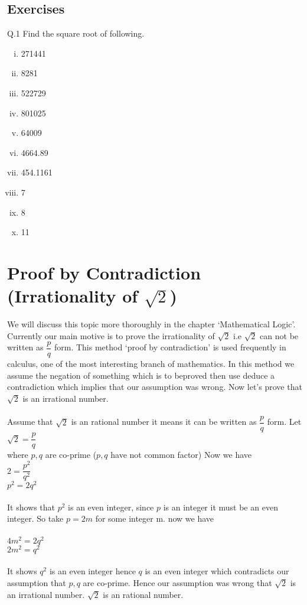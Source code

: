 \subsection{Exercises}
Q.1 Find the square root of following.
\begin{multicols}{5}
\begin{enumerate}[(i)]
\item 271441
\item 8281
\item 522729
\item 801025
\item 64009
\item 4664.89
\item 454.1161
\item 7
\item 8
\item 11
\end{enumerate}
\end{multicols}
\section{Proof by Contradiction (Irrationality of $\sqrt{2}$)}
We will discuss this topic more thoroughly in the chapter ‘Mathematical
Logic’. Currently
our main motive is to prove the irrationality of $\sqrt{2} \text{ i.e } \sqrt{2}$
can not be written as $\dfrac{p}{q}$ form. This
method ‘proof by contradiction’ is used frequently in calculus, one of
the most interesting
branch of mathematics. In this method we assume the negation of
something which is to beproved then use deduce a contradiction which
implies that our assumption was wrong. Now let’s prove that $\sqrt{2}$ is an
irrational number.\\\\
Assume that $\sqrt{2}$ is an rational number it means it can be written
as $\dfrac{p}{q}$
form. Let\\
$\sqrt{2} = \dfrac{p}{q}$\\
where $p, q$ are co-prime ($p, q$ have not common factor) Now we have\\
$2 = \dfrac{p^2}{q^2}$\\
$p^2 = 2 q^2$\\\\
It shows that $p^2$ is an even integer, since $p$ is an integer it must be
an even integer. So take $p = 2m$ for some integer m. now we
have\\\\
$4 m^2 = 2q^2$\\
$2 m^2 = q^2$\\\\
It shows $q^2$ is an even integer hence $q$ is an even integer which
contradicts our assumption
that $p, q$ are co-prime. Hence our assumption was wrong that
$\sqrt{2}$ is an irrational number.
$\sqrt{2}$ is an rational number.\\\\ 
